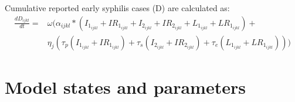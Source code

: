 \documentclass[a4paper]{article}
\begin{document}
\newline Cumulative reported early syphilis cases (D) are calculated as:
\begin{equation*}\label{3}
	\begin{aligned}
		\frac{dD_{ijkl}}{dt}={} & \omega (\alpha_{ijkl} *(I_{1_{ijkl}} + IR_{1_{ijkl}}  + I_{2_{ijkl}} + IR_{2_{ijkl}} + L_{1_{ijkl}} +  LR_{1_{ijkl}}) + \\  
& \eta_j (\tau_p (I_{1_{ijkl}} + IR_{1_{ijkl}} ) + \tau_s (I_{2_{ijkl}} + IR_{2_{ijkl}} )  + \tau_e (L_{1_{ijkl}} + LR_{1_{ijkl}}) ) )
	\end{aligned}
\end{equation*}
\newpage
\setcounter{table}{0}
\renewcommand{\thetable}{S\arabic{table}}
\section{Model states and parameters}
\end{document}
